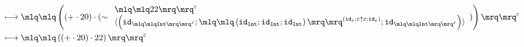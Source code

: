 \documentclass{article}
\begin{document}
\begin{align*}
\longmapsto &\;\quot{\left(\left(+\cdot 20\right)\cdot (\sim \begin{array}{l}\quot{22}^{\varepsilon}\\\langle\left(\mathtt{id}_{\quot{\mathtt{Int}}^{\varepsilon}};\quot{\left(\mathtt{id}_{\mathtt{Int}};\mathtt{id}_{\mathtt{Int}};\mathtt{id}_{\mathtt{Int}}\right)}^{\left(\mathtt{id}_{\varepsilon};\varepsilon \uparrow \varepsilon;\mathtt{id}_{\varepsilon}\right)};\mathtt{id}_{\quot{\mathtt{Int}}^{\varepsilon}}\right)\rangle\end{array})\right)}^{\varepsilon}\\ 
\longmapsto &\;\quot{\left(\left(+\cdot 20\right)\cdot 22\right)}^{\varepsilon}\\ 
\end{align*}
\end{document}
